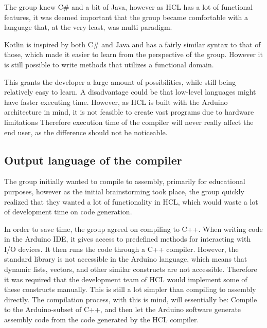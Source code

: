 The group knew C\# and a bit of Java, however as HCL has a lot of functional features, it was deemed important that the group became comfortable with a language that, at the very least, was multi paradigm.

Kotlin is inspired by both C\# and Java and has a fairly similar syntax to that of those, which made it easier to learn from the perspective of the group.
However it is still possible to write methods that utilizes a functional domain.

This grants the developer a large amount of possibilities, while still being relatively easy to learn.
A disadvantage could be that low-level languages might have faster executing time. 
However, as HCL is built with the Arduino architecture in mind, it is not feasible to create vast programs due to hardware limitations
Therefore execution time of the compiler will never really affect the end user, as the difference should not be noticeable.

\subsection{Output language of the compiler}
The group initially wanted to compile to assembly, primarily for educational purposes, however as the initial brainstorming took place, the group quickly realized that they wanted a lot of functionality in HCL, which would waste a lot of development time on code generation.

In order to save time, the group agreed on compiling to C++.
When writing code in the Arduino IDE, it gives access to predefined methods for interacting with I/O devices.
It then runs the code through a C++ compiler\cite{ArFAQ}.
However, the standard library is not accessible in the Arduino language, which means that dynamic lists, vectors, and other similar constructs are not accessible.
Therefore it was required that the development team of HCL would implement some of these constructs manually.
This is still a lot simpler than compiling to assembly directly. 
The compilation process, with this is mind, will essentially be: Compile to the Arduino-subset of C++, and then let the Arduino software generate assembly code from the code generated by the HCL compiler.
